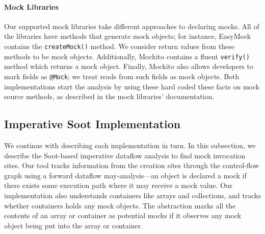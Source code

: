 \paragraph{Mock Libraries}
Our supported mock libraries take different approaches to declaring mocks. All of the libraries have methods that generate mock objects; for instance, EasyMock contains the \texttt{createMock()} method. We consider return values from these methods to be mock objects. Additionally, Mockito contains a fluent \texttt{verify()} method which returns a mock object. Finally, Mockito also allows developers to mark fields as \texttt{@Mock}; we treat reads from such fields as mock objects. Both implementations start the analysis by using these hard coded these facts on mock source methods, as described in the mock libraries' documentation.

\subsection{Imperative Soot Implementation}
\label{subsec:soot}
We continue with describing each implementation in turn. In this subsection, we describe the Soot-based imperative dataflow analysis to find mock invocation sites. Our tool tracks information from the creation sites through the control-flow graph using a forward dataflow may-analysis---an object is declared a mock if there exists some execution path where it may receive a mock value. Our implementation also understands containers like arrays and collections, and tracks whether containers holds any mock objects. The abstraction marks all the contents of an array or container as potential mocks if it observes any mock object being put into the array or container.






